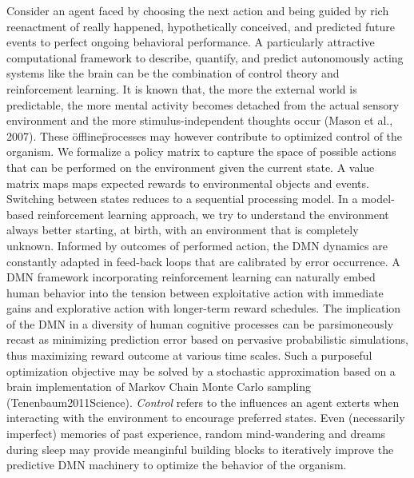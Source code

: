 \documentclass{article} %
\begin{document}
Consider an agent faced by choosing the next action
and being guided by rich
reenactment of really happened, hypothetically conceived, and
predicted future events to perfect ongoing behavioral performance.
A particularly attractive computational framework
to describe, quantify, and predict autonomously acting systems like the brain
can be the combination of control theory and reinforcement learning.
It is known that, the more the external world is predictable,
the more mental activity becomes detached from the actual sensory environment
and the more stimulus-independent thoughts occur
(Mason et al., 2007).
These \"offline\" processes may however contribute to optimized control of the organism.
We formalize
a policy matrix to capture the space of possible actions that can be performed
on the environment given the current state. A value matrix 
maps maps expected rewards to environmental objects and events.
Switching between states reduces to a sequential processing model.
In a model-based reinforcement learning approach,
we try to understand the environment always better
starting, at birth, with an environment that is completely unknown.
Informed by outcomes of performed action,
the DMN dynamics are constantly adapted in feed-back loops
that are calibrated by error occurrence.
A DMN framework incorporating reinforcement learning
can naturally embed human behavior
into the tension between exploitative action with immediate gains and
explorative action with longer-term reward schedules.
The implication of the DMN in a diversity of human cognitive processes
can be parsimoneously recast as minimizing prediction error
based on pervasive probabilistic simulations,
thus maximizing reward outcome at various time scales.
Such a purposeful optimization objective
may be solved by a stochastic approximation
based on a brain implementation of Markov Chain Monte Carlo sampling
(Tenenbaum2011Science).
\textit{Control} refers to the influences an agent exterts when interacting
with the environment to encourage preferred states.
Even (necessarily imperfect) memories
of past experience, random mind-wandering and dreams during sleep
may provide meanginful building blocks to iteratively improve
the predictive DMN machinery to optimize the behavior of the organism.
\end{document}
